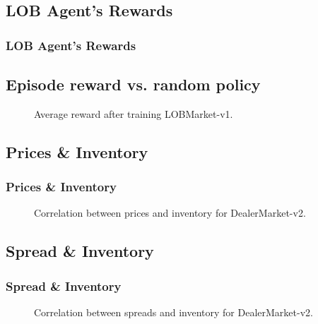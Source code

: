 \documentclass[aspectratio=1610]{beamer}
\begin{document}
\subsection{ LOB Agent's Rewards}

\begin{frame}[shrink=10]
  \frametitle{\hfill LOB Agent's Rewards}
  
  \subsection*{Episode reward vs. random policy}
    \begin{figure}[H]
    	    	\centering
    		
    		\caption{ \small Average reward after training LOBMarket-v1.}
    		\label{fig:p1}
    \end{figure}
  
\end{frame}

\subsection{Prices \& Inventory}

\begin{frame}[shrink=10]
  \frametitle{\hfill Prices \& Inventory}
   \begin{figure}[H]
    	    	\centering
    		
    		\caption{ \small Correlation between prices and inventory for DealerMarket-v2.}
    		\label{fig:s1}
    \end{figure}
  
\end{frame}
\subsection{Spread \& Inventory}

\begin{frame}[shrink=10]
  \frametitle{\hfill Spread \& Inventory}
   \begin{figure}[H]
    	    	\centering
    		
    		\caption{ \small Correlation between spreads and inventory for DealerMarket-v2.}
    		\label{fig:dmv12}
    \end{figure}
  
\end{frame}
\end{document}
